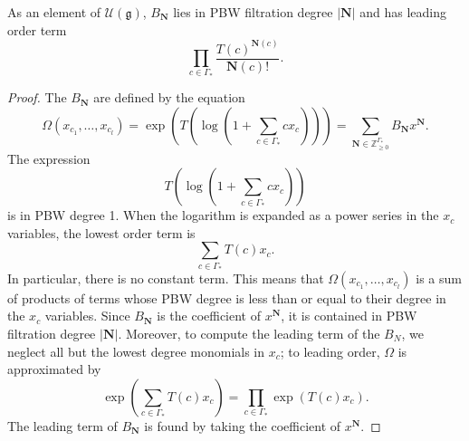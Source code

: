 \begin{lemma} \label{leading_term_lemma}
As an element of $\mathcal{U}(\mathfrak{g})$, $B_{\mathbf{N}}$ lies in PBW filtration degree $|\mathbf{N}|$ and has leading order term
\[
\prod_{c \in \Gamma_*} \frac{T(c)^{\mathbf{N}(c)}}{\mathbf{N}(c)!}.
\]
\end{lemma}
\begin{proof}
The $B_{\mathbf{N}}$ are defined by the equation
\[
\Omega(x_{c_1}, \ldots, x_{c_l}) = \exp\left(T\left(\log\left(1 + \sum_{c \in \Gamma_*} c x_c\right)\right)\right) = \sum_{\mathbf{N} \in \mathbb{Z}_{\geq 0}^{\Gamma_*}} B_{\mathbf{N}} x^{\mathbf{N}}.
\]
The expression
\[
T\left(\log\left(1 + \sum_{c \in \Gamma_*} c x_c\right)\right)
\]
is in PBW degree 1. When the logarithm is expanded as a power series in the $x_c$ variables, the lowest order term is
\[
\sum_{c \in \Gamma_*} T(c) x_c.
\]
In particular, there is no constant term. This means that $\Omega(x_{c_1}, \ldots, x_{c_l})$ is a sum of products of terms whose PBW degree is less than or equal to their degree in the $x_c$ variables. Since $B_{\mathbf{N}}$ is the coefficient of $x^{\mathbf{N}}$, it is contained in PBW filtration degree $|\mathbf{N}|$. Moreover, to compute the leading term of the $B_N$, we neglect all but the lowest degree monomials in $x_c$; to leading order, $\Omega$ is approximated by
\[
\exp\left( \sum_{c \in \Gamma_*} T(c) x_c\right) = 
\prod_{c \in \Gamma_*} \exp\left( T(c) x_c\right).
\]
The leading term of $B_{\mathbf{N}}$ is found by taking the coefficient of $x^{\mathbf{N}}$.
\end{proof}


